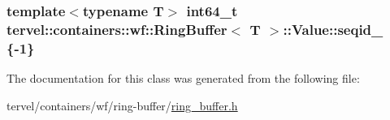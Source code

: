 \subsubsection[{seqid\+\_\+}]{\setlength{\rightskip}{0pt plus 5cm}template$<$typename T$>$ int64\+\_\+t {\bf tervel\+::containers\+::wf\+::\+Ring\+Buffer}$<$ T $>$\+::Value\+::seqid\+\_\+ \{-\/1\}\hspace{0.3cm}{\ttfamily [private]}}\label{classtervel_1_1containers_1_1wf_1_1_ring_buffer_1_1_value_aaecdcc3fbb8c5a8b784625e835c7d6ef}


The documentation for this class was generated from the following file\+:\begin{DoxyCompactItemize}
\item 
tervel/containers/wf/ring-\/buffer/\hyperlink{ring__buffer_8h}{ring\+\_\+buffer.\+h}\end{DoxyCompactItemize}

